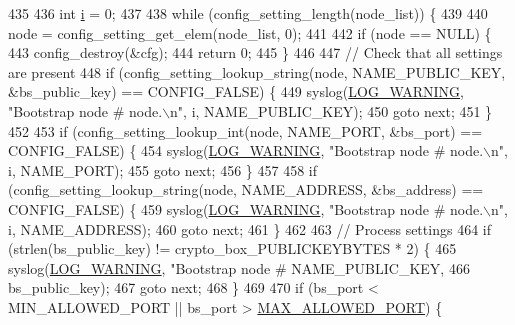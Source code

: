 \begin{DoxyCode}
{435 
436     \textcolor{keywordtype}{int} \hyperlink{toxav__many__test_8c_acb559820d9ca11295b4500f179ef6392}{i} = 0;
437 
438     \textcolor{keywordflow}{while} (config\_setting\_length(node\_list)) \{
439 
440         node = config\_setting\_get\_elem(node\_list, 0);
441 
442         \textcolor{keywordflow}{if} (node == NULL) \{
443             config\_destroy(&cfg);
444             \textcolor{keywordflow}{return} 0;
445         \}
446 
447         \textcolor{comment}{// Check that all settings are present}
448         \textcolor{keywordflow}{if} (config\_setting\_lookup\_string(node, NAME\_PUBLIC\_KEY, &bs\_public\_key) == CONFIG\_FALSE) \{
449             syslog(\hyperlink{logger_8h_aa5a9053636a30269210c54e734e0d583a8f6fe15bfe15104da6d1b360194a5400}{LOG\_WARNING}, \textcolor{stringliteral}{"Bootstrap node #%
       node.\(\backslash\)n"}, i, NAME\_PUBLIC\_KEY);
450             \textcolor{keywordflow}{goto} next;
451         \}
452 
453         \textcolor{keywordflow}{if} (config\_setting\_lookup\_int(node, NAME\_PORT, &bs\_port) == CONFIG\_FALSE) \{
454             syslog(\hyperlink{logger_8h_aa5a9053636a30269210c54e734e0d583a8f6fe15bfe15104da6d1b360194a5400}{LOG\_WARNING}, \textcolor{stringliteral}{"Bootstrap node #%
       node.\(\backslash\)n"}, i, NAME\_PORT);
455             \textcolor{keywordflow}{goto} next;
456         \}
457 
458         \textcolor{keywordflow}{if} (config\_setting\_lookup\_string(node, NAME\_ADDRESS, &bs\_address) == CONFIG\_FALSE) \{
459             syslog(\hyperlink{logger_8h_aa5a9053636a30269210c54e734e0d583a8f6fe15bfe15104da6d1b360194a5400}{LOG\_WARNING}, \textcolor{stringliteral}{"Bootstrap node #%
       node.\(\backslash\)n"}, i, NAME\_ADDRESS);
460             \textcolor{keywordflow}{goto} next;
461         \}
462 
463         \textcolor{comment}{// Process settings}
464         \textcolor{keywordflow}{if} (strlen(bs\_public\_key) != crypto\_box\_PUBLICKEYBYTES * 2) \{
465             syslog(\hyperlink{logger_8h_aa5a9053636a30269210c54e734e0d583a8f6fe15bfe15104da6d1b360194a5400}{LOG\_WARNING}, \textcolor{stringliteral}{"Bootstrap node #%
       NAME\_PUBLIC\_KEY,
466                    bs\_public\_key);
467             \textcolor{keywordflow}{goto} next;
468         \}
469 
470         \textcolor{keywordflow}{if} (bs\_port < MIN\_ALLOWED\_PORT || bs\_port > \hyperlink{tox-bootstrapd_8c_a83828e6f5b4b788b1781b298a3a221cd}{MAX\_ALLOWED\_PORT}) \{
}}
\end{DoxyCode}

